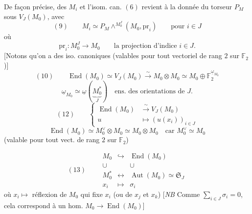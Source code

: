 \documentclass[11pt,a4paper]{article}
\begin{document}
De façon précise,  des  $M_i$ et  l'isom. can. $(6)$ revient à la donnée du torseur $P_M$ sous $V_J(M_0)$, avec
\[
  (9) \qquad M_i \simeq P_M \wedge^{M_0^J} (M_0, \mathrm{pr}_i) \qquad \text{pour } i \in J
\]
où
\[
  \mathrm{pr}_i : M_0^J \to M_0 \qquad \text{la projection d'indice } i \in J .
\]
[Notons qu'on a des iso. canoniques (valables pour tout vectoriel de rang $2$ sur $\mathbb{F}_2$)]
\[
  (10) \qquad \operatorname{End}(M_0) \simeq V_J(M_0) \xrightarrow{\;\sim\;} M_0 \otimes M_0 \simeq M_0 \oplus \mathbb{F}_2^{\underline{\omega}_{M_0}}
\]
\[
  \underline{\omega}_{M_0} \simeq \underline{\omega}(\underset{J}{\underbrace{M_0^*}}) \quad \text{ens. des orientations de } J .
\]
\[
  (12) \qquad
  \left\{
  \begin{aligned}
    \operatorname{End}(M_0) &\xrightarrow{\;\sim\;} V_J(M_0) \\
    u &\longmapsto (u(x_i))_{i \in J}
  \end{aligned}
  \right.
\]
\[
  \operatorname{End}(M_0) \simeq M_0^\vee \otimes M_0 \simeq M_0 \otimes M_0 \quad \text{car } M_0^\vee \simeq M_0
\]
(valable pour tout vect. de rang $2$ sur $\mathbb{F}_2$)

\[
  (13) \qquad
  \begin{array}{ccc}
    M_0 & \hookrightarrow & \operatorname{End}(M_0) \\
    \cup & & \cup \\
    M_0^* & \longleftrightarrow & \operatorname{Aut}(M_0) \simeq \mathfrak{S}_J \\
    x_i & \longmapsto & \sigma_i
  \end{array}
\]
où $x_i \mapsto$   réflexion de $M_0$ qui fixe $x_i$ (ou \struck{\ill{}}  de $x_j$ et $x_k$)
[\emph{NB} Comme $\sum_{i \in J} \sigma_i = 0$, cela correspond à un hom. $M_0 \to \operatorname{End}(M_0)$]
\end{document}
